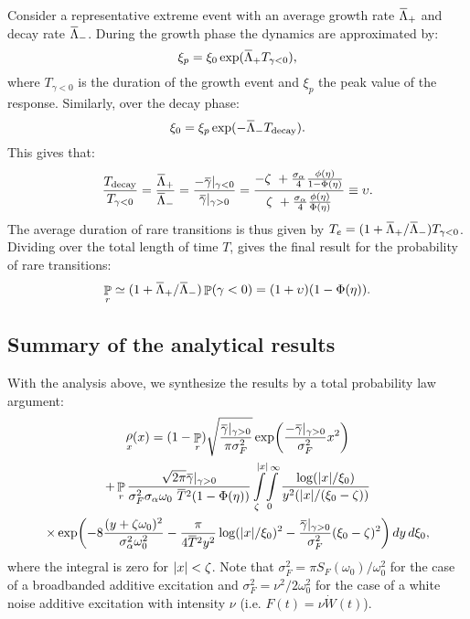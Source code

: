 \documentclass[3p]{elsarticle}
\newcommand{\overbar}[1]{\mkern 1mu\overline{\mkern-1mu#1\mkern-1mu}\mkern 1mu}
\DeclarePairedDelimiter\abs{\lvert}{\rvert}
\DeclareMathOperator{\prob}{\mathbb P}
\DeclareMathOperator{\pdf}{\rho}
\begin{document}
Consider a representative extreme event with an average growth rate $\overbar{\Lambda}_+$ and decay rate $\overbar{\Lambda}_- $. During the growth phase the dynamics are approximated by:
\begin{equation}\label{eq:osc_typicalgrowth}
        \xi_p = \xi_0 \exp({\overbar{\Lambda}_+ T_{\gamma<0}}),
\end{equation}
where $T_{\gamma<0}$ is the duration of the growth event and $\xi_p$ the peak value of the response. Similarly, over the decay phase:
\begin{equation}\label{eq:osc_typicaldecay}
        \xi_0 = \xi_p \exp({-\overbar{\Lambda}_- T_\text{decay}}).
\end{equation}
This gives that: 
\begin{equation}\label{eq:Probability_connection}
\frac{T_\text{decay}}{T_{\gamma<0}} = \frac{\overbar{\Lambda}_+}{\overbar{\Lambda}_{-}} =  \frac{-\overbar{\gamma}|_{\gamma<0}}{\overbar{\gamma}|_{\gamma>0}} =  \frac{-\zeta\ + \frac{\sigma_{\alpha}}{4} \frac{\phi(\eta)}{1-\Phi(\eta)}}{ \zeta\ +  \frac{\sigma_{\alpha}}{4}  \frac{\phi(\eta)}{\Phi(\eta)}} \equiv \upsilon.
\end{equation}
The average duration of rare transitions is thus given by $T_e = (1 + \overbar{\Lambda}_+/\overbar{\Lambda}_- ) T_{\gamma<0}$. Dividing over the total length of time $T$, gives the final result for the probability of rare transitions:
\begin{equation}
\prob_r  \simeq  (1 + \overbar{\Lambda}_+/\overbar{\Lambda}_- ) \prob(\gamma<0) =  (1 + \upsilon)(1 - \Phi(\eta) ).
\end{equation}


\subsection{Summary of the analytical results}

With the analysis above, we synthesize the results by a total probability law argument:\begin{multline}\label{eq:mathanalyic}
\pdf_x( x ) = (1-\prob_r) \sqrt{\frac{\overbar \gamma |_{\gamma>0}}{\pi \sigma_F^2 }} \exp \biggl( \frac{-\overbar \gamma |_{\gamma>0}}{\sigma_F^2} x^2 \biggr) \\+ 
\prob_r  \frac{ \sqrt{ 2 \pi} \overbar\gamma|_{\gamma>0}
}{\sigma_F^2 \sigma_{\alpha}\omega_0\ \overbar  T^2 (1-\Phi(\eta))   }  \int\limits_\zeta^{\abs{x}}\!\int\limits_0^\infty
\frac{\log(\abs{x}/\xi_0)}{y^2(\abs{x}/(\xi_0-\zeta))} \\ \times\exp\biggl(-8\frac{(y
+ \zeta \omega_0)^2}{ \sigma_{\alpha}^2\omega_0^2}  - \frac{\pi}{4 \overbar
T^2 y^2 } \log(\abs{x}/\xi_0)^2 - \frac{\overbar\gamma|_{\gamma>0}}{\sigma_F^2}
(\xi_0-\zeta)^2 \bigg) \,dy\,d\xi_0,
\end{multline}
where the integral is   zero for $\abs{x} < \zeta$. Note that $\sigma_F^2 = \pi S_F(\omega_0)/\omega_0^2$  for the case of a broadbanded additive   excitation and $\sigma_F^2 = \nu^2/2\omega_0^2$ for the case of a white noise additive excitation   with intensity $\nu$ (i.e. $F(t) = \nu \dot W(t)$). 
\end{document}
